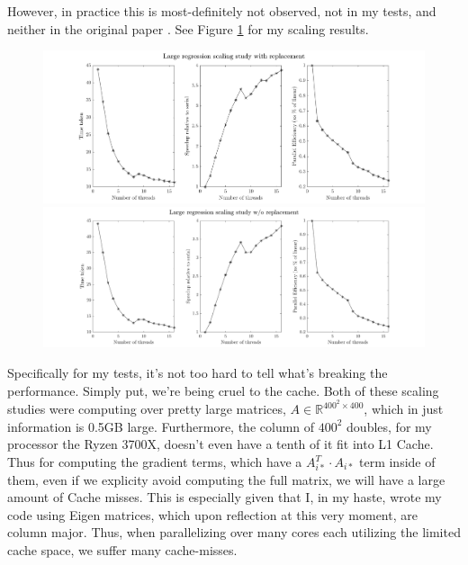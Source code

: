 However, in practice this is most-definitely not observed, not in my tests, and
neither in the original paper \cite{2011NRRW}. See Figure \ref{fig:scaling} for
my scaling results.
\begin{figure}[!htb]
  \centering
  \includegraphics[width=1\textwidth]{./resources/replacement}
  \includegraphics[width=1\textwidth]{./resources/noreplacement}
  \caption{
  } \label{fig:scaling}
\end{figure}
Specifically for my tests, it's not too hard to tell what's breaking the
performance. Simply put, we're being cruel to the cache. Both of these scaling
studies were computing over pretty large matrices, $A \in \mathbb{R}^{400^2
\times 400}$, which in just information is 0.5GB large. Furthermore, the column
of $400^2$ doubles, for my processor the Ryzen 3700X, doesn't even have a tenth
of it fit into L1 Cache. Thus for computing the gradient terms, which have
a $A_{i*}^T \cdot A_{i*}$ term inside of them, even if we explicity avoid
computing the full matrix, we will have a large amount of Cache misses. This is
especially given that I, in my haste, wrote my code using Eigen matrices, which
upon reflection at this very moment, are column major. Thus, when parallelizing
over many cores each utilizing the limited cache space, we suffer many
cache-misses.

